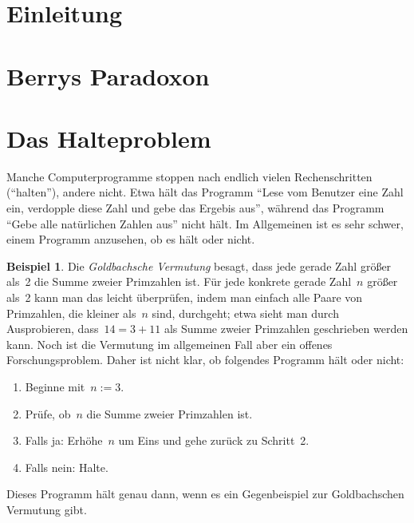 \documentclass[twoside]{../zirkelblatt1415}
\theoremstyle{definition}
\newtheorem{bsp}[defn]{Beispiel}
\theoremstyle{plain}
\theoremstyle{remark}
\newenvironment{listing}{
  \renewcommand*\theenumi{\arabic{enumi}}
  \renewcommand{\labelenumi}{\theenumi.}
  \begin{enumerate}\itemsep0em}{\end{enumerate}}
\begin{document}

{\renewcommand{\addvspace}[1]{\vskip0.6em}
\tableofcontents%
}

\section{Einleitung}


\section{Berrys Paradoxon}


\section{Das Halteproblem}

Manche Computerprogramme stoppen nach endlich vielen Rechenschritten
("`halten"'), andere nicht. Etwa hält das Programm "`Lese vom Benutzer eine
Zahl ein, verdopple diese Zahl und gebe das Ergebis aus"', während das Programm
"`Gebe alle natürlichen Zahlen aus"' nicht hält. Im Allgemeinen ist es sehr
schwer, einem Programm anzusehen, ob es hält oder nicht.

\begin{bsp}\label{bsp:unklares-programm}Die \emph{Goldbachsche Vermutung}
besagt, dass jede gerade Zahl
größer als~2 die Summe zweier Primzahlen ist. Für jede
konkrete gerade Zahl~$n$ größer als~2 kann man das leicht überprüfen, indem man
einfach alle Paare von Primzahlen, die kleiner als~$n$ sind, durchgeht; etwa
sieht man durch Ausprobieren, dass~$14 = 3 + 11$ als Summe zweier Primzahlen
geschrieben werden kann. Noch ist die Vermutung im allgemeinen Fall aber ein
offenes Forschungsproblem. Daher ist nicht klar, ob folgendes Programm hält
oder nicht:
\begin{listing}
\item[1.] Beginne mit~$n := 3$.
\item[2.] Prüfe, ob~$n$ die Summe zweier Primzahlen ist.
\item[3.] Falls ja: Erhöhe~$n$ um Eins und gehe zurück zu Schritt~2.
\item[4.] Falls nein: Halte.
\end{listing}
Dieses Programm hält genau dann, wenn es ein Gegenbeispiel zur Goldbachschen
Vermutung gibt.
\end{bsp}
\end{document}
